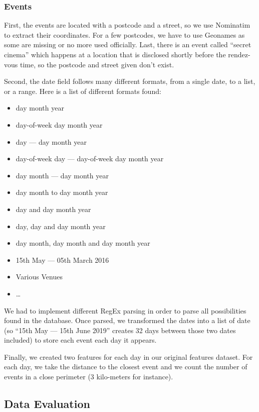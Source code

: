 \subsubsection{Events}

First, the events are located with a postcode and a street, so we use Nominatim to extract
their coordinates. For a few postcodes, we have to use Geonames as some are missing
or no more used officially. Last, there is an event called ``secret cinema'' which
happens at a location that is disclosed shortly before the rendez-vous time, so
the postcode and street given don't exist.

Second, the date field follows many different formats, from a single date, to a list,
or a range. Here is a list of different formats found:
\begin{itemize}
    \item day month year
    \item day-of-week day month year
    \item day --- day month year
    \item day-of-week day --- day-of-week day month year
    \item day month --- day month year
    \item day month to day month year
    \item day and day month year
    \item day, day and day month year
    \item day month, day month and day month year
    \item 15th May --- 05th March 2016
    \item Various Venues
    \item \ldots{}
\end{itemize}

We had to implement different RegEx parsing in order to parse all possibilities
found in the database.
Once parsed, we transformed the dates into a list of date
(so ``15th May --- 15th June 2019'' creates 32 days between those two dates included)
to store each event each day it appears.

Finally, we created two features for each day in our original features dataset.
For each day, we take the distance to the closest event and we count the number
of events in a close perimeter (3 kilo-meters for instance).

\subsection{Data Evaluation}

